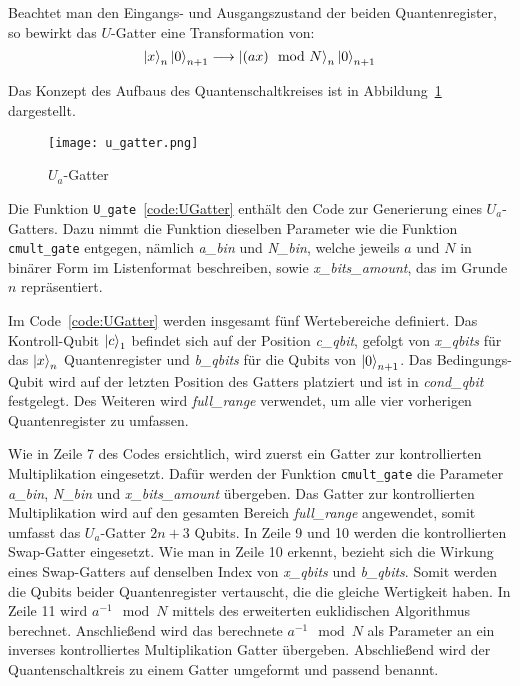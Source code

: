 Beachtet man den Eingangs- und Ausgangszustand der beiden Quantenregister, 
so bewirkt das \(U\)-Gatter eine Transformation von:
 \[\ket{x}_{n}\ket{0}_{n+1} 
 \longrightarrow 
 \ket{(ax)\mod N}_{n}\ket{0}_{n+1}\]

Das Konzept des Aufbaus des Quantenschaltkreises ist in Abbildung~\ref{fig:u_gatter} dargestellt.
\begin{figure} [H]
  \centering
  \texttt{[image: u\_gatter.png]}
  \caption{\(U_a\)-Gatter~\cite{beauregard2003circuit}}
  \label{fig:u_gatter}
\end{figure}

Die Funktion \texttt{U\_gate}~\ref{code:UGatter} enthält den Code zur Generierung eines \(U_a\)-Gatters.
Dazu nimmt die Funktion dieselben Parameter wie die Funktion \texttt{cmult\_gate} entgegen, 
nämlich  \textit{a\_bin} und \textit{N\_bin}, welche jeweils \(a\) und \(N\) in binärer Form im Listenformat beschreiben,  
sowie \textit{x\_bits\_amount}, das im Grunde \(n\) repräsentiert.

Im Code~\ref{code:UGatter} werden insgesamt fünf Wertebereiche definiert.
Das Kontroll-Qubit \(\ket{c}_1\) befindet sich auf der Position \textit{c\_qbit},
gefolgt von \textit{x\_qbits} für das \(\ket{x}_{n}\) Quantenregister und  
\textit{b\_qbits} für die Qubits von \(\ket{0}_{n+1}\).
Das Bedingungs-Qubit wird auf der letzten Position des Gatters platziert und  
ist in \textit{cond\_qbit} festgelegt.
Des Weiteren wird \textit{full\_range} verwendet,
um alle vier vorherigen Quantenregister zu umfassen.

Wie in Zeile 7 des Codes ersichtlich, wird zuerst ein Gatter zur kontrollierten Multiplikation eingesetzt.
Dafür werden der Funktion \texttt{cmult\_gate} die Parameter \textit{a\_bin}, \textit{N\_bin} und \textit{x\_bits\_amount} übergeben.
Das Gatter zur kontrollierten Multiplikation wird auf den gesamten Bereich \textit{full\_range} angewendet, 
somit umfasst das \(U_a\)-Gatter \(2n+3\) Qubits.
In Zeile 9 und 10 werden die kontrollierten Swap-Gatter eingesetzt.
Wie man in Zeile 10 erkennt, bezieht sich die Wirkung eines Swap-Gatters auf denselben Index von \textit{x\_qbits} und \textit{b\_qbits}.
Somit werden die Qubits beider Quantenregister vertauscht, die die gleiche Wertigkeit haben.
In Zeile 11 wird \(a^{-1}\mod N\) mittels des erweiterten euklidischen Algorithmus berechnet.
Anschließend wird das berechnete \(a^{-1}\mod N\) als Parameter an ein inverses kontrolliertes Multiplikation Gatter übergeben.
Abschließend wird der Quantenschaltkreis zu einem Gatter umgeformt und passend benannt.

